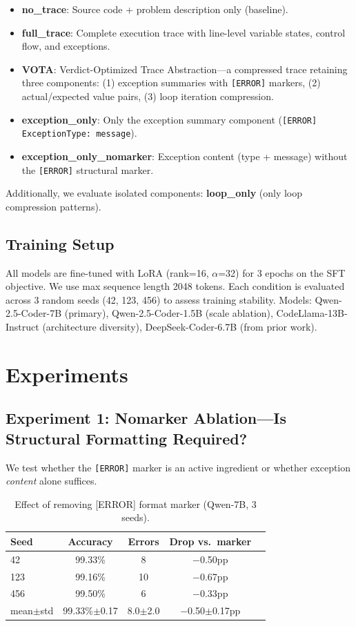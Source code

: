 \documentclass[11pt]{article}
\begin{document}
\begin{itemize}
\item \textbf{no\_trace}: Source code + problem description only (baseline).
\item \textbf{full\_trace}: Complete execution trace with line-level variable states, control flow, and exceptions.
\item \textbf{VOTA}: Verdict-Optimized Trace Abstraction---a compressed trace retaining three components: (1) exception summaries with \texttt{[ERROR]} markers, (2) actual/expected value pairs, (3) loop iteration compression.
\item \textbf{exception\_only}: Only the exception summary component (\texttt{[ERROR] ExceptionType: message}).
\item \textbf{exception\_only\_nomarker}: Exception content (type + message) without the \texttt{[ERROR]} structural marker.
\end{itemize}

Additionally, we evaluate isolated components: \textbf{loop\_only} (only loop compression patterns).

\subsection{Training Setup}

All models are fine-tuned with LoRA (rank=16, $\alpha$=32) for 3 epochs on the SFT objective. We use max sequence length 2048 tokens. Each condition is evaluated across 3 random seeds (42, 123, 456) to assess training stability. Models: Qwen-2.5-Coder-7B (primary), Qwen-2.5-Coder-1.5B (scale ablation), CodeLlama-13B-Instruct (architecture diversity), DeepSeek-Coder-6.7B (from prior work).

\section{Experiments}

\subsection{Experiment 1: Nomarker Ablation---Is Structural Formatting Required?}

We test whether the \texttt{[ERROR]} marker is an active ingredient or whether exception \emph{content} alone suffices.

\begin{table}[h]
\centering
\caption{Effect of removing [ERROR] format marker (Qwen-7B, 3 seeds).}
\label{tab:nomarker}
\begin{tabular}{lcccc}
\toprule
Seed & Accuracy & Errors & Drop vs.\ marker \\
\midrule
42 & 99.33\% & 8 & $-$0.50pp \\
123 & 99.16\% & 10 & $-$0.67pp \\
456 & 99.50\% & 6 & $-$0.33pp \\
\midrule
mean$\pm$std & 99.33\%$\pm$0.17 & 8.0$\pm$2.0 & $-$0.50$\pm$0.17pp \\
\bottomrule
\end{tabular}
\end{table}
\end{document}
